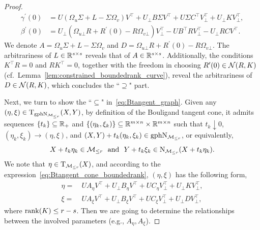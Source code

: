 \begin{proof}
\begin{equation}\label{eq:gammap_betap_eta2}
    \begin{aligned}
    \gamma^\prime(0) &= U(\Omega_u\varSigma+L-\varSigma\Omega_v)V^\top + U_\bot B\varSigma V^\top + U\varSigma C^\top V_\bot^\top + U_{\bot}KV_{\bot}^\top,
    \\
    \beta^\prime(0) &= U_\bot(\Omega_{u\bot}R+R^\prime(0)-R\Omega_{v\bot})V_\bot ^\top - UB^\top R V_\bot^\top - U_\bot R CV^\top.
    \end{aligned}
\end{equation}
We denote $A=\Omega_u\varSigma+L-\varSigma\Omega_v$ and $D=\Omega_{u\bot}R+R^\prime(0)-R\Omega_{v\bot}$. The arbitrariness of $L\in\mathbb{R}^{s\times s}$ reveals that of $A\in\mathbb{R}^{s\times s}$. Additionally, the conditions $K^\top R=0$ and $RK^\top=0$, together with the freedom in choosing $R^\prime(0)\in\mathcal{N}(R,K)$ (cf.~Lemma~\ref{lem:constrained_boundedrank_curve}), reveal the arbitrariness of $D\in\mathcal{N}(R,K)$, which concludes the ``$\supseteq$" part.




Next, we turn to show the ``$\subseteq$" in~\eqref{eq:Btangent_graph}. Given any $(\eta,\xi)\in\mathrm{T}_{\mathrm{gph}\mathrm{N}_{\mathcal{M}_{\le r}}}(X,Y)$, by definition of the Bouligand tangent cone, it admits sequences $\{t_k\}\subseteq \mathbb{R}_+$ and $\{(\eta_k,\xi_k)\}\subseteq \mathbb{R}^{m\times n}\times\mathbb{R}^{m\times n}$ such that $t_k\downarrow 0$, $(\eta_k,\xi_k)\to(\eta,\xi)$, and $(X,Y)+t_k(\eta_k,\xi_k)\in\mathrm{gph}\mathrm{N}_{\mathcal{M}_{\le r}}$, or equivalently,
\begin{equation}\label{eq:relation_sequence}
    X+t_k\eta_k\in\boundedrank\ \ \text{and}\ \ Y+t_k\xi_k\in\Lnormal_{\boundedrank}(X+t_k\eta_k).
\end{equation}
We note that $\eta\in\mathrm{T}_{\mathcal{M}_{\le r}}(X)$, and according to the expression~\eqref{eq:Btangent_cone_boundedrank}, $(\eta,\xi)$ has the following form,
\begin{equation}\label{eq:eta_four_term}
\begin{aligned}
\eta=&\ UA_\eta V^\top+U_\bot B_\eta V^\top+UC_\eta V^\top_\bot+U_{\bot}K V^\top_{\bot},      
\\
\xi=&\ UA_\xi V^\top+U_\bot B_\xi V^\top+UC_\xi V^\top_\bot+U_{\bot}D V^\top_{\bot},  
\end{aligned}
\end{equation}
where $\operatorname{rank}(K)\le r-s$. Then we are going to determine the relationships between the involved parameters (e.g., $A_\eta,A_\xi$).


\end{proof}

